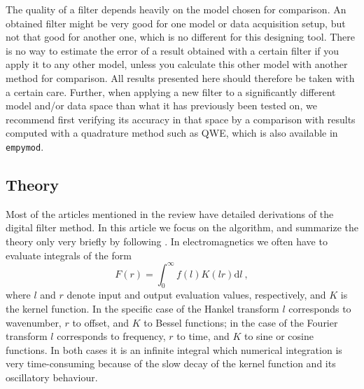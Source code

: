 \documentclass[paper,twocolumn,twoside]{geophysics}
\newcommand{\mr}[1]{\mathrm{#1}}
\begin{document}
The quality of a filter depends heavily on the model chosen for comparison. An
obtained filter might be very good for one model or data acquisition setup, but
not that good for another one, which is no different for this designing tool.
There is no way to estimate the error of a result obtained with a certain
filter if you apply it to any other model, unless you calculate this other
model with another method for comparison. All results presented here should
therefore be taken with a certain care. Further, when applying a new filter to
a significantly different model and/or data space than what it has previously
been tested on, we recommend first verifying its accuracy in that space by a
comparison with results computed with a quadrature method such as QWE, which is
also available in \texttt{empymod}.

\subsection{Theory}

Most of the articles mentioned in the review have detailed derivations of the
digital filter method. In this article we focus on the algorithm, and summarize
the theory only very briefly by following \cite{GEO.12.Key}. In
electromagnetics we often have to evaluate integrals of the form
%
\begin{equation}
  F(r) = \int^\infty_0 f(l)K(l r)\mr{d}l \ ,
  \label{eq:HankelInt}
\end{equation}
%
where $l$ and $r$ denote input and output evaluation values, respectively, and
$K$ is the kernel function. In the specific case of the Hankel transform $l$
corresponds to wavenumber, $r$ to offset, and $K$ to Bessel functions; in the
case of the Fourier transform $l$ corresponds to frequency, $r$ to time, and
$K$ to sine or cosine functions. In both cases it is an infinite integral which
numerical integration is very time-consuming because of the slow decay of the
kernel function and its oscillatory behaviour.
\end{document}

